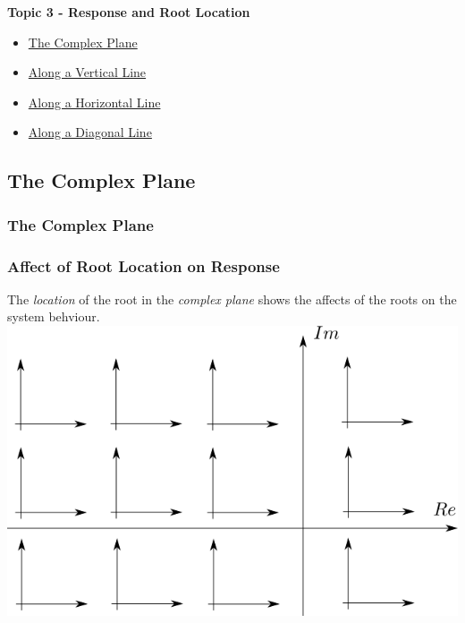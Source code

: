\documentclass[fleqn]{beamer} %
\newcommand{\sectionIIItitle}{Response and Root Location}
\newcommand{\sectionIIIsubsectionItitle}{The Complex Plane}
\newcommand{\sectionIIIsubsectionIItitle}{Along a Vertical Line}
\newcommand{\sectionIIIsubsectionIIItitle}{Along a Horizontal Line}
\newcommand{\sectionIIIsubsectionIVtitle}{Along a Diagonal Line}
\begin{document}
		\begin{frame}
			\large \textbf{Topic 3 - \sectionIIItitle} \vspace{3mm}\\

			\begin{itemize}
				\item \hyperlink{sectionIIIsubsectionI}{\sectionIIIsubsectionItitle} \vspc %
				\item \hyperlink{sectionIIIsubsectionII}{\sectionIIIsubsectionIItitle} \vspc %
				\item \hyperlink{sectionIIIsubsectionIII}{\sectionIIIsubsectionIIItitle} \vspc %
				\item \hyperlink{sectionIIIsubsectionIV}{\sectionIIIsubsectionIVtitle} \vspc %
			\end{itemize}

		\end{frame}

		\subsection{\sectionIIIsubsectionItitle}\label{sectionIIIsubsectionI}

			\begin{frame}
				\frametitle{\sectionIIIsubsectionItitle}
				\bigskip

				\frametitle{Affect of Root Location on Response}
 	
				The {\it location} of the root in the {\it complex plane} shows the affects of the roots on the system behviour.\vspc
				\includegraphics[scale=0.4]{images/lecture3_fig5.png}

				\btVFill
			\end{frame}
\end{document}
